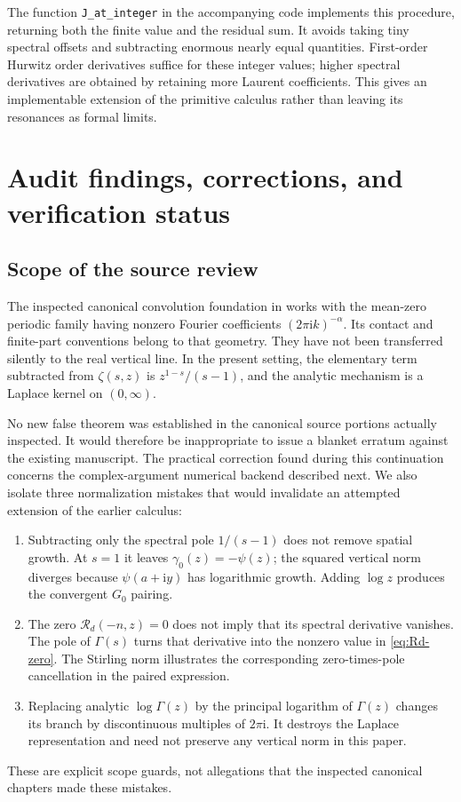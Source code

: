 \documentclass[11pt,a4paper]{article}
\theoremstyle{definition}
\numberwithin{equation}{section}
\newcommand{\ii}{\mathrm i}
\begin{document}
The function \texttt{J\_at\_integer} in the accompanying code implements
this procedure, returning both the finite value and the residual sum.
It avoids taking tiny spectral offsets and subtracting enormous nearly
equal quantities. First-order Hurwitz order derivatives suffice for these
integer values; higher spectral derivatives are obtained by retaining
more Laurent coefficients. This gives an implementable extension of the
primitive calculus rather than leaving its resonances as formal limits.

\section{Audit findings, corrections, and verification status}
\label{sec:audit}

\subsection{Scope of the source review}
The inspected canonical convolution foundation in \cite{repo} works with
the mean-zero periodic family having nonzero Fourier coefficients
$(2\pi\ii k)^{-\alpha}$. Its contact and finite-part conventions belong
to that geometry. They have not been transferred silently to the real
vertical line. In the present setting, the elementary term subtracted from
$\zeta(s,z)$ is $z^{1-s}/(s-1)$, and the analytic mechanism is a Laplace
kernel on $(0,\infty)$.

No new false theorem was established in the canonical source portions
actually inspected. It would therefore be inappropriate to issue a
blanket erratum against the existing manuscript. The practical correction
found during this continuation concerns the complex-argument numerical
backend described next. We also isolate three normalization mistakes
that would invalidate an attempted extension of the earlier calculus:
\begin{enumerate}
\item Subtracting only the spectral pole $1/(s-1)$ does not remove spatial
      growth. At $s=1$ it leaves $\gamma_0(z)=-\psi(z)$; the squared
      vertical norm diverges because $\psi(a+\ii y)$ has logarithmic
      growth. Adding $\log z$ produces the convergent $G_0$ pairing.
\item The zero $\mathcal R_d(-n,z)=0$ does not imply that its spectral
      derivative vanishes. The pole of $\Gamma(s)$ turns that derivative
      into the nonzero value in \eqref{eq:Rd-zero}. The Stirling norm
      illustrates the corresponding zero-times-pole cancellation in
      the paired expression.
\item Replacing analytic $\log\Gamma(z)$ by the principal logarithm of
      $\Gamma(z)$ changes its branch by discontinuous multiples of
      $2\pi\ii$. It destroys the Laplace representation and need not
      preserve any vertical norm in this paper.
\end{enumerate}
These are explicit scope guards, not allegations that the inspected
canonical chapters made these mistakes.
\end{document}
